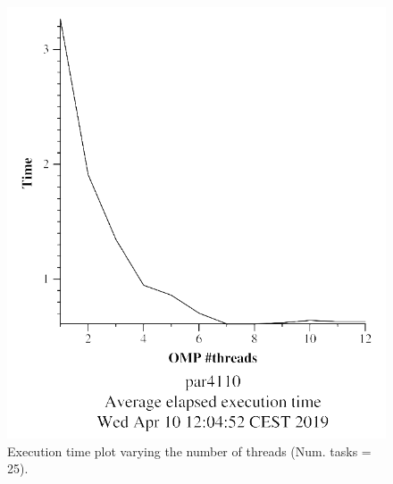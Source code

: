 \documentclass[12pt, a4paper]{article}
\begin{document}
\begin{figure}[H]
\centering
\begin{minipage}[b]{0.4\linewidth}
  \centering
  \includegraphics[scale=0.5]{./mandel-omp-10000-strong-omp-3-25-time}
  \caption{Execution time plot varying the number of threads (Num. tasks = 25).}
  \label{fig:mandel-omp-10000-strong-omp-3-25-time}
\end{minipage}%
\hspace{0.5cm}
\begin{minipage}[b]{0.4\linewidth}
  \centering

\end{minipage}
\end{figure}
\end{document}
